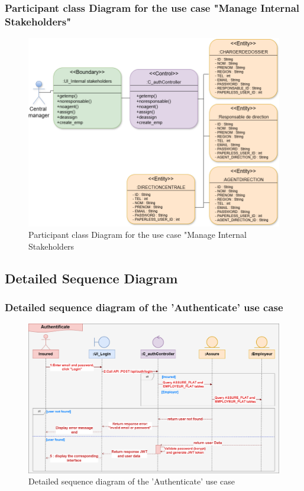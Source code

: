 \subsubsection{Participant class Diagram for the use case "Manage Internal Stakeholders"}
 \begin{figure}[h!]
    \centering
    \includegraphics[width=1\textwidth]{figures/dc Manages Internal Stakeholders.png}
    \caption{Participant class Diagram for the use case "Manage Internal Stakeholders}
    \label{fig:image4}
\end{figure}

\subsection{Detailed Sequence Diagram}
\subsubsection{Detailed sequence diagram of the 'Authenticate' use case}
\clearpage
\begin{figure}[h!]
    \centering
    \includegraphics[width=1\textwidth]{figures/det authentificate.png}
    \caption{Detailed sequence diagram of the 'Authenticate' use case}
    \label{fig:image4}
\end{figure}

